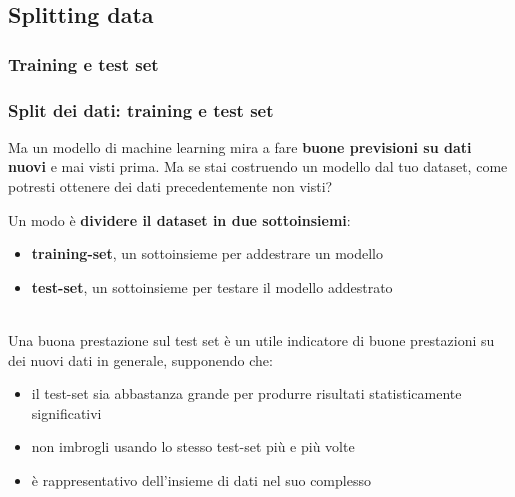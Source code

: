 \subsection[Splitting data]{Splitting data}

\subsubsection[Training e test set]{Training e test set}


\begin{frame}

	\frametitle{Split dei dati: training e test set}

	Ma un modello di machine learning mira a fare \textbf{buone previsioni su dati nuovi} e mai visti prima.
	Ma se stai costruendo un modello dal tuo dataset, come potresti ottenere dei dati precedentemente non visti?\vspace{3mm}
	\pause

	Un modo è \textbf{dividere il dataset in due sottoinsiemi}:
	\begin{itemize}
		\item \textbf{training-set}, un sottoinsieme per addestrare un modello
		\item \textbf{test-set}, un sottoinsieme per testare il modello addestrato
	\end{itemize}
	\ \\
	Una buona prestazione sul test set è un utile indicatore di buone prestazioni su dei nuovi dati in generale, supponendo che:
	\begin{itemize}
		\item il test-set sia abbastanza grande per produrre risultati statisticamente significativi
		\item non imbrogli usando lo stesso test-set più e più volte
		\item è rappresentativo dell'insieme di dati nel suo complesso
	\end{itemize}
\end{frame}


